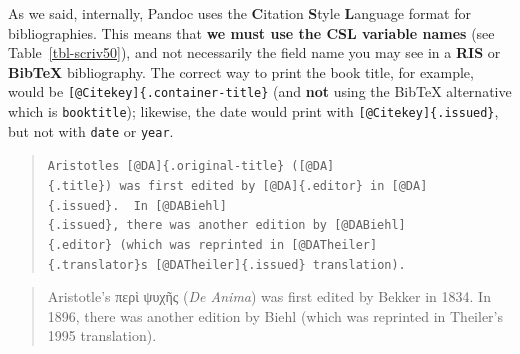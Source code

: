 \documentclass[
  12pt,
  a4paper,
  oneside,
  numbers=noenddot,
  titlepage,
  toclink=all,
  toc=bibliography]{scrbook}
\theoremstyle{definition}
\theoremstyle{definition}
\theoremstyle{definition}
\theoremstyle{plain}
\theoremstyle{plain}
\theoremstyle{plain}
\theoremstyle{plain}
\theoremstyle{plain}
\theoremstyle{remark}
\begin{document}
As we said, internally, Pandoc uses the \textbf{C}itation \textbf{S}tyle
\textbf{L}anguage format for bibliographies. This means that \textbf{we
must use the CSL variable names} (see
\protect\hypertarget{cite_109}{}{\label{cite_109}Table~\ref{tbl-scriv50}}),
and not necessarily the field name you may see in a \textbf{RIS} or
\textbf{BibTeX} bibliography. The correct way to print the book title,
for example, would be \texttt{{[}@Citekey{]}\{.container-title\}} (and
\textbf{not} using the BibTeX alternative which is \texttt{booktitle});
likewise, the date would print with \texttt{{[}@Citekey{]}\{.issued\}},
but not with \texttt{date} or \texttt{year}.

\begin{quote}
\texttt{Aristotle\textquotesingle{}s\ {[}@DA{]}\{.original-title\}\ ({[}@DA{]}\{.title\})\ was\ first\ edited\ by\ {[}@DA{]}\{.editor\}\ in\ {[}@DA{]}\{.issued\}.\ \ In\ {[}@DABiehl{]}\{.issued\},\ there\ was\ another\ edition\ by\ {[}@DABiehl{]}\{.editor\}\ (which\ was\ reprinted\ in\ {[}@DATheiler{]}\{.translator\}\textquotesingle{}s\ {[}@DATheiler{]}\{.issued\}\ translation).}
\end{quote}

\begin{quote}
Aristotle's περὶ ψυχῆς (\emph{De Anima}) was first edited by Bekker in
1834. In 1896, there was another edition by Biehl (which was reprinted
in Theiler's 1995 translation).
\end{quote}
\end{document}
